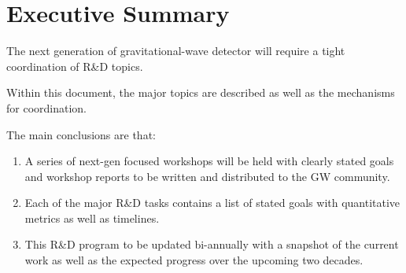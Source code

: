 \section{Executive Summary}
\label{sec:Exec}


The next generation of gravitational-wave detector will require a tight coordination of R\&D topics.

Within this document, the major topics are described as well as the mechanisms for coordination.

The main conclusions are that:
\begin{enumerate}
\item A series of next-gen focused workshops will be held with clearly stated goals and workshop reports to be written and distributed to the GW community.

\item Each of the major R\&D tasks contains a list of stated goals with quantitative metrics as well as timelines.

\item This R\&D program to be updated bi-annually with a snapshot of the current work as well as the expected progress over the upcoming two decades.
\end{enumerate}
